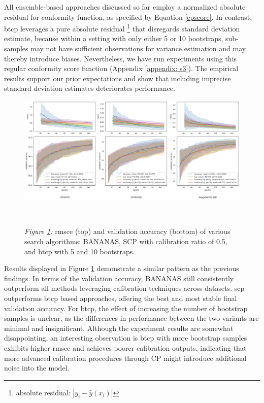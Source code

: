 \documentclass[a4paper,oneside,bibliography=totoc]{scrbook}
\begin{document}
\begin{description}[leftmargin=0cm, listparindent=\parindent]
		All ensemble-based approaches discussed so far employ a normalized absolute residual for conformity function, as specified by Equation \ref{cpscore}. In contrast, \gls{btcp} leverages a pure absolute residual \footnote{absolute residual: $|y_i - \hat{y}(x_i)|$} that disregards standard deviation estimate, because within a setting with only either 5 or 10 bootstraps, sub-samples may not have sufficient observations for variance estimation and may thereby introduce biases. Nevertheless, we have run experiments using this regular conformity score function (Appendix \ref{appendix: s3}). The empirical results support our prior expectations and show that including imprecise standard deviation estimates deteriorates performance.
	
	\vspace{0.3em}
	\begin{figure}[H]
		\centering
		\includegraphics[scale=0.37 ]{figs/bootstrap.png}
		\label{fig: btcp}
		\\
 		\parbox{\linewidth}{
		\vspace{1em}
 	  		{\small \textit{Figure \ref{fig: btcp}:} \gls{rmsce} (top) and validation accuracy (bottom) of various search algorithms: BANANAS, SCP with calibration ratio of 0.5, and \gls{btcp} with 5 and 10 bootstraps.}
 	 	}	
	\end{figure}	 
	
	\vspace{1em}
	Results displayed in Figure \ref{fig: btcp} demonstrate a similar pattern as the previous findings. In terms of the validation accuracy, BANANAS still consistently outperform all methods leveraging calibration techniques across datasets. \gls{scp} outperforms \gls{btcp} based approaches, offering the best and most stable final validation accuracy. For \gls{btcp}, the effect of increasing the number of bootstrap samples is unclear, as the differences in performance between the two variants are minimal and insignificant. Although the experiment results are somewhat disappointing, an interesting observation is \gls{btcp} with more bootstrap samples exhibits higher \gls{rmsce} and achieves poorer calibration outputs, indicating that more advanced calibration procedures through CP might introduce additional noise into the model.
		

\end{description}
\end{document}
